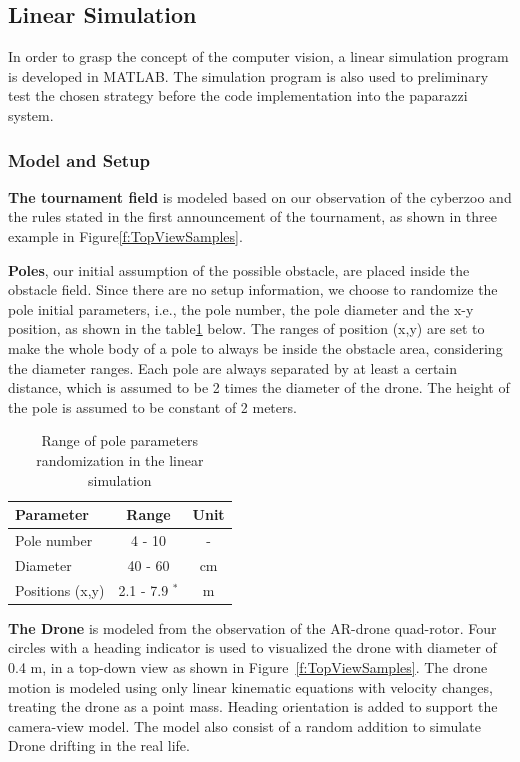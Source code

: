 \subsection{Linear Simulation}
\label{subsec:lin_sim}
In order to grasp the concept of the computer vision, a linear simulation program is developed in MATLAB. The simulation program is also used to preliminary test the chosen strategy before the code implementation into the paparazzi system.  

\subsubsection{Model and Setup}
\textbf{The tournament field} is modeled based on our observation of the cyberzoo and the rules stated in the first announcement of the tournament, as shown in three example in Figure\ref{f:TopViewSamples}.

\textbf{Poles}, our initial assumption of the possible obstacle, are placed inside the obstacle field. Since there are no setup information, we choose to randomize the pole initial parameters, i.e., the pole number, the pole diameter and the x-y position, as shown in the table\ref{t:RandomPole} below. The ranges of position (x,y) are set to make the whole body of a pole to always be inside the obstacle area, considering the diameter ranges. Each pole are always separated by at least a certain distance, which is assumed to be 2 times the diameter of the drone. The height of the pole is assumed  to be constant of 2 meters. 

\begin{table}
\caption{Range of pole parameters randomization in the linear simulation}
\label{t:RandomPole}
\begin{center}
\begin{tabular}{lcc}
\hline \hline
Parameter & Range & Unit \\\hline
Pole number & 4 - 10 & - \\
Diameter & 40 - 60 & cm \\
Positions (x,y) & 2.1 - 7.9 $^*$ & m \\\hline\hline
\end{tabular}
\end{center}

\end{table}

\textbf{The Drone} is modeled from the observation of the AR-drone quad-rotor. Four circles with a heading indicator is used to visualized the drone with diameter of 0.4 m, in a top-down view as shown in Figure~\ref{f:TopViewSamples}. The drone motion is modeled using only linear kinematic equations with velocity changes, treating the drone as a point mass. Heading orientation is added to support the camera-view model. The model also consist of a random addition to simulate Drone drifting in the real life. 

